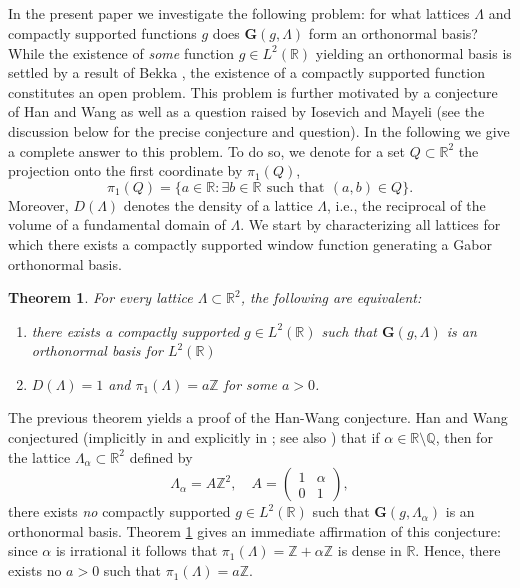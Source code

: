 \documentclass[reqno,a4paper,12pt]{amsart}
\numberwithin{equation}{section}
\newtheorem{theorem}[definition]{Theorem}
\def\Z{{\mathbb Z}}
\def\R{{\mathbb R}}
\def\Q{{\mathbb Q}}
\newcommand{\lt}{{L^2(\R)}}
\newcommand\1{\mathds{1}}
\begin{document}
\subsection{}
In the present paper we investigate the following problem: for what lattices $\Lambda$ and compactly supported functions $g$ does $\mathbf G(g,\Lambda)$ form an orthonormal basis? While the existence of \emph{some} function $g \in \lt$ yielding an orthonormal basis is settled by a result of Bekka \cite{bekka}, the existence of a compactly supported function constitutes an open problem. This problem is further motivated by a conjecture of Han and Wang \cite{HW01,HW04,LM19} as well as a question raised by Iosevich and Mayeli \cite{IM18} (see the discussion below for the precise conjecture and question). In the following we give a complete answer to this problem. To do so, we denote for a set $Q \subset \R^2$ the projection onto the first coordinate by $\pi_1(Q)$,
$$
\pi_1(Q) = \{ a \in \R : \exists b \in \R \ \, \text{such that} \ \, (a,b) \in Q \}.
$$
Moreover, $D(\Lambda)$ denotes the density of a lattice $\Lambda$, i.e., the reciprocal of the volume of a fundamental domain of $\Lambda$. We start by characterizing all lattices for which there exists a compactly supported window function generating a Gabor orthonormal basis.

\begin{theorem}\label{thm:main1}
    For every lattice $\Lambda \subset \R^2$, the following are equivalent:
    \begin{enumerate}
        \item there exists a compactly supported $g \in \lt$ such that $\mathbf{G}(g,\Lambda)$ is an orthonormal basis for $\lt$
        \item $D(\Lambda)=1$ and $\pi_1(\Lambda) = a \Z$ for some $a>0$.
    \end{enumerate}
\end{theorem}

The previous theorem yields a proof of the Han-Wang conjecture. Han and Wang conjectured (implicitly in \cite{HW01} and explicitly in \cite[p. 186]{HW04}; see also \cite[p. 3095]{LM19}) that if $\alpha \in \R \setminus \Q$, then for the lattice $\Lambda_\alpha \subset \R^2$ defined by
    \begin{equation}\label{eq:han_wang_matrix}
        \Lambda_\alpha = A\Z^2, \quad
    A = \begin{pmatrix}
        1 & \alpha \\ 0 & 1
    \end{pmatrix},
    \end{equation}
    there exists \emph{no} compactly supported $g \in \lt$ such that $\mathbf G(g,\Lambda_\alpha)$ is an orthonormal basis. Theorem \ref{thm:main1} gives an immediate affirmation of this conjecture: since $\alpha$ is irrational it follows that $\pi_1(\Lambda) = \Z + \alpha \Z$ is dense in $\R$. Hence, there exists no $a > 0$ such that $\pi_1(\Lambda) = a\Z$.
    
\end{document}
